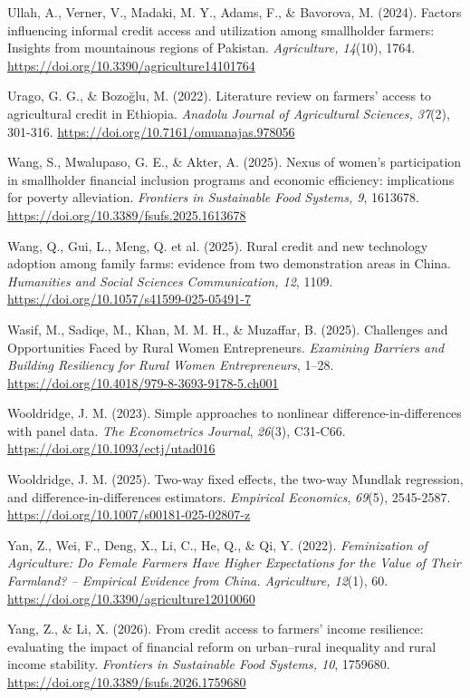 \documentclass[
]{article}
\begin{document}
Ullah, A., Verner, V., Madaki, M. Y., Adams, F., \& Bavorova, M. (2024).
Factors influencing informal credit access and utilization among
smallholder farmers: Insights from mountainous regions of Pakistan.
\emph{Agriculture, 14}(10), 1764.
\url{https://doi.org/10.3390/agriculture14101764}

Urago, G. G., \& Bozoğlu, M. (2022). Literature review on farmers'
access to agricultural credit in Ethiopia. \emph{Anadolu Journal of
Agricultural Sciences, 37}(2), 301-316.
\url{https://doi.org/10.7161/omuanajas.978056}

Wang, S., Mwalupaso, G. E., \& Akter, A. (2025). Nexus of women's
participation in smallholder financial inclusion programs and economic
efficiency: implications for poverty alleviation. \emph{Frontiers in
Sustainable Food Systems, 9}, 1613678.
\url{https://doi.org/10.3389/fsufs.2025.1613678}

Wang, Q., Gui, L., Meng, Q. et al. (2025). Rural credit and new
technology adoption among family farms: evidence from two demonstration
areas in China. \emph{Humanities and Social Sciences Communication, 12},
1109. \url{https://doi.org/10.1057/s41599-025-05491-7}

Wasif, M., Sadiqe, M., Khan, M. M. H., \& Muzaffar, B. (2025).
Challenges and Opportunities Faced by Rural Women Entrepreneurs.
\emph{Examining Barriers and Building Resiliency for Rural Women
Entrepreneurs}, 1--28.
\url{https://doi.org/10.4018/979-8-3693-9178-5.ch001}

Wooldridge, J. M. (2023). Simple approaches to nonlinear
difference-in-differences with panel data. \emph{The Econometrics
Journal}, \emph{26}(3), C31-C66.
\url{https://doi.org/10.1093/ectj/utad016}

Wooldridge, J. M. (2025). Two-way fixed effects, the two-way Mundlak
regression, and difference-in-differences estimators. \emph{Empirical
Economics}, \emph{69}(5), 2545-2587.
\url{https://doi.org/10.1007/s00181-025-02807-z}

Yan, Z., Wei, F., Deng, X., Li, C., He, Q., \& Qi, Y. (2022).
\emph{Feminization of Agriculture: Do Female Farmers Have Higher
Expectations for the Value of Their Farmland? -- Empirical Evidence from
China. Agriculture, 12}(1), 60.
\url{https://doi.org/10.3390/agriculture12010060}

Yang, Z., \& Li, X. (2026). From credit access to farmers' income
resilience: evaluating the impact of financial reform on urban--rural
inequality and rural income stability. \emph{Frontiers in Sustainable
Food Systems, 10}, 1759680.
\url{https://doi.org/10.3389/fsufs.2026.1759680}
\end{document}
